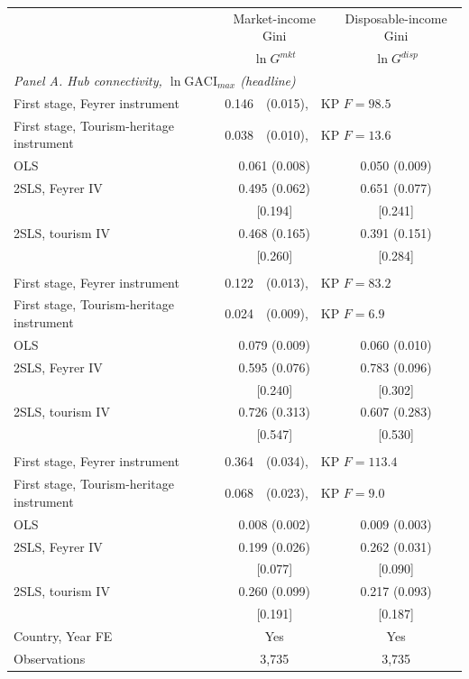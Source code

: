 \begin{tabular}{lcc}
\toprule
 & Market-income Gini & Disposable-income Gini \\
 & $\ln G^{mkt}$ & $\ln G^{disp}$ \\
\midrule
\multicolumn{3}{l}{\emph{Panel A. Hub connectivity, $\ln\mathrm{GACI}_{max}$ (headline)}}\\
First stage, Feyrer instrument & \multicolumn{2}{l}{0.146\sym{***}\ \ (0.015),\ \ KP $F=98.5$} \\
First stage, Tourism-heritage instrument & \multicolumn{2}{l}{0.038\sym{***}\ \ (0.010),\ \ KP $F=13.6$} \\
OLS & 0.061\sym{***} (0.008) & 0.050\sym{***} (0.009) \\
2SLS, Feyrer IV & 0.495\sym{***} (0.062) & 0.651\sym{***} (0.077) \\
 & [0.194]\sym{**} & [0.241]\sym{***} \\
2SLS, tourism IV & 0.468\sym{***} (0.165) & 0.391\sym{***} (0.151) \\
 & [0.260]\sym{*} & [0.284] \\
\addlinespace
\multicolumn{3}{l}{\emph{Panel B. Hub quality, $\ln\mathrm{GACI}_{cwm}$}}\\
First stage, Feyrer instrument & \multicolumn{2}{l}{0.122\sym{***}\ \ (0.013),\ \ KP $F=83.2$} \\
First stage, Tourism-heritage instrument & \multicolumn{2}{l}{0.024\sym{***}\ \ (0.009),\ \ KP $F=6.9$} \\
OLS & 0.079\sym{***} (0.009) & 0.060\sym{***} (0.010) \\
2SLS, Feyrer IV & 0.595\sym{***} (0.076) & 0.783\sym{***} (0.096) \\
 & [0.240]\sym{**} & [0.302]\sym{***} \\
2SLS, tourism IV & 0.726\sym{**} (0.313) & 0.607\sym{**} (0.283) \\
 & [0.547] & [0.530] \\
\addlinespace
\multicolumn{3}{l}{\emph{Panel C. Total connectivity, $\ln\mathrm{GACI}_{sum}$}}\\
First stage, Feyrer instrument & \multicolumn{2}{l}{0.364\sym{***}\ \ (0.034),\ \ KP $F=113.4$} \\
First stage, Tourism-heritage instrument & \multicolumn{2}{l}{0.068\sym{***}\ \ (0.023),\ \ KP $F=9.0$} \\
OLS & 0.008\sym{***} (0.002) & 0.009\sym{***} (0.003) \\
2SLS, Feyrer IV & 0.199\sym{***} (0.026) & 0.262\sym{***} (0.031) \\
 & [0.077]\sym{***} & [0.090]\sym{***} \\
2SLS, tourism IV & 0.260\sym{***} (0.099) & 0.217\sym{**} (0.093) \\
 & [0.191] & [0.187] \\
\addlinespace
\midrule
Country, Year FE & Yes & Yes \\
Observations & 3,735 & 3,735 \\
\bottomrule
\end{tabular}